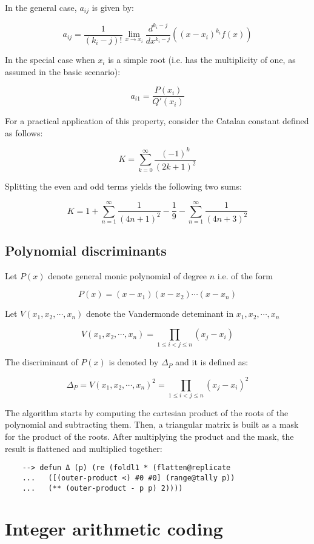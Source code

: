 In the general case, $a_{ij}$ is given by:

$$
{\displaystyle a_{ij}={\frac {1}{(k_{i}-j)!}}\lim _{x\to x_{i}}{\frac {d^{k_{i}-j}}{dx^{k_{i}-j}}}\left((x-x_{i})^{k_{i}}f(x)\right)}
$$

In the special case when $x_i$ is a simple root (i.e. has the multiplicity of one, as assumed in the basic scenario):

$$
a_{i1}={\frac {P(x_{i})}{Q'(x_{i})}}
$$

For a practical application of this property, consider the Catalan constant defined as follows:

$$
K = \sum_{k=0}^\infty \frac{(-1)^k}{(2k+1)^2}
$$

Splitting the even and odd terms yields the following two sums:

$$
K = 1 + \sum_{n=1}^\infty \frac{1}{(4n+1)^2} - \frac{1}{9} - \sum_{n=1}^\infty \frac{1}{(4n+3)^2}
$$

\subsection{Polynomial discriminants}

Let $P(x)$ denote general monic polynomial of degree $n$ i.e. of the form

$$
P(x) = (x-x_1)(x-x_2) \cdots (x-x_n)
$$

\noindent Let $V(x_1,x_2, \cdots, x_n)$ denote the Vandermonde deteminant in $x_1,x_2, \cdots, x_n$

$$
V(x_1,x_2, \cdots , x_n) = \prod\limits_{1 \leq i < j \leq n} (x_j - x_i)
$$

\noindent The discriminant of $P(x)$ is denoted by $\Delta_P$ and it is defined as:

$$
\Delta_P = V(x_1,x_2, \cdots , x_n)^2 = \prod\limits_{1 \leq i < j \leq n} (x_j - x_i)^2
$$

The algorithm starts by computing the cartesian product of the roots of the polynomial and subtracting them. Then, a triangular matrix is built as a mask for the product of the roots. After multiplying the product and the mask, the result is flattened and multiplied together:

\begin{Verbatim}
    --> defun Δ (p) (re (foldl1 * (flatten@replicate
    ...   ([(outer-product <) #0 #0] (range@tally p))
    ...   (** (outer-product - p p) 2))))
\end{Verbatim}

\section{Integer arithmetic coding}

